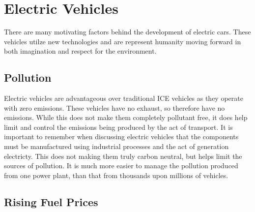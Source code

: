 \section{Electric Vehicles} %
There are many motivating factors behind the development of electric cars. These vehicles utilze new technologies and are represent humanity moving forward in both imagination and respect for the environment.


\subsection{Pollution} %

Electric vehicles are advantageous over traditional ICE vehicles as they operate with zero emissions. These vehicles have no exhaust, so therefore have no emissions. While this does not make them completely pollutant free, it does help limit and control the emissions being produced by the act of transport. It is important to remember when discussing electric vehicles that the components must be manufactured using industrial processes and the act of generation electricty. This does not making them truly carbon neutral, but helps limit the sources of pollution. It is much more easier to manage the pollution produced from one power plant, than that from thousands upon millions of vehicles.
\cite{citeulike:9725732}


\subsection{Rising Fuel Prices}